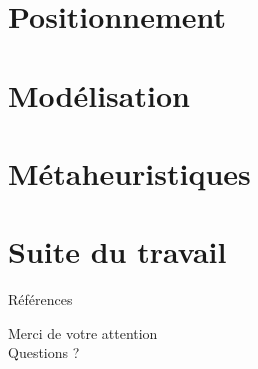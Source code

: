 \documentclass[aspectratio=169,11pt]{beamer}
\begin{document}


\section{Positionnement}



\section{Modélisation}



\section{Métaheuristiques}



\section{Suite du travail}



\nocite{*}
\begin{frame}{Références}
  \footnotesize
  \printbibliography[heading=none]
\end{frame}

{
\begin{frame}
  \begin{center}
    \Large
    Merci de votre attention\\[0.5em]
    Questions ?
  \end{center}
\end{frame}
}
\end{document}
